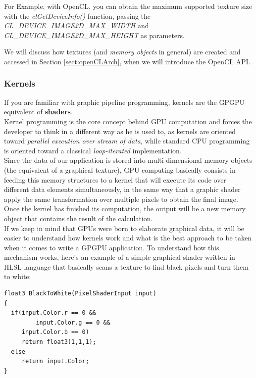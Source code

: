 \begin{CLCode}
For Example, with OpenCL, you can obtain the maximum supported texture size with the \textsl{clGetDeviceInfo()} function, passing the
\textsl{CL\_DEVICE\_IMAGE2D\_MAX\_WIDTH} and \textsl{CL\_DEVICE\_IMAGE2D\_MAX\_HEIGHT} as parameters.
\end{CLCode}

We will discuss how textures (and \textit{memory objects} in general) are created and accessed in Section \ref{sect:openCLArch}, when we will introduce the OpenCL API.

\subsubsection{Kernels}
If you are familiar with graphic pipeline programming, kernels are the GPGPU equivalent of \textbf{shaders}.\\
Kernel programming is the core concept behind GPU computation and forces the developer to think in a different way as he is used to, as kernels are oriented toward \emph{parallel execution over stream of data}, while standard CPU programming is oriented toward a classical \emph{loop-iterated} implementation.\\
Since the data of our application is stored into multi-dimensional memory objects (the equivalent of a graphical texture), GPU computing basically consists in feeding this memory structures to a kernel that will execute its code over different data elements simultaneously, in the same way that a graphic shader apply the same transformation over multiple pixels to obtain the final image.\\
Once the kernel has finished its computation, the output will be a new memory object that contains the result of the calculation.\\ If we keep in mind that GPUs were born to elaborate graphical data, it will be easier to understand how kernels work and what is the best approach to be taken when it comes to write a GPGPU application.
To understand how this mechanism works, here's an example of a simple graphical shader written in HLSL language that basically scans a texture to find black pixels and turn them to white:

\newpage
{\footnotesize\begin{verbatim}
float3 BlackToWhite(PixelShaderInput input)
{
  if(input.Color.r == 0 &&
	     input.Color.g == 0 && 
     input.Color.b == 0)
     return float3(1,1,1);
  else
     return input.Color;
}
\end{verbatim}}

